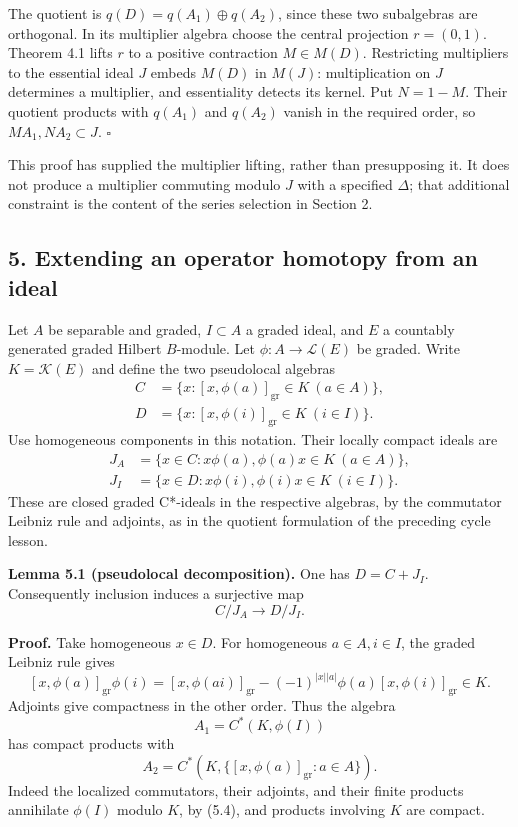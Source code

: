 \documentclass[
  11pt,
]{article}
\begin{document}
The quotient is \(q(D)=q(A_1)\oplus q(A_2)\), since these two
subalgebras are orthogonal. In its multiplier algebra choose the central
projection \(r=(0,1)\). Theorem 4.1 lifts \(r\) to a positive
contraction \(M\in M(D)\). Restricting multipliers to the essential
ideal \(J\) embeds \(M(D)\) in \(M(J)\): multiplication on \(J\)
determines a multiplier, and essentiality detects its kernel. Put
\(N=1-M\). Their quotient products with \(q(A_1)\) and \(q(A_2)\) vanish
in the required order, so \(MA_1,NA_2\subset J\). \(\square\)

This proof has supplied the multiplier lifting, rather than presupposing
it. It does not produce a multiplier commuting modulo \(J\) with a
specified \(\Delta\); that additional constraint is the content of the
series selection in Section 2.

\subsection{5. Extending an operator homotopy from an
ideal}\label{extending-an-operator-homotopy-from-an-ideal}

Let \(A\) be separable and graded, \(I\subset A\) a graded ideal, and
\(E\) a countably generated graded Hilbert \(B\)-module. Let
\(\phi:A\to\mathcal L(E)\) be graded. Write \(K=\mathcal K(E)\) and
define the two pseudolocal algebras \[
\begin{aligned}
C&=\{x:[x,\phi(a)]_{\mathrm{gr}}\in K\ (a\in A)\},\\
D&=\{x:[x,\phi(i)]_{\mathrm{gr}}\in K\ (i\in I)\}.
\end{aligned}
\tag{5.1}
\] Use homogeneous components in this notation. Their locally compact
ideals are \[
\begin{aligned}
J_A&=\{x\in C:x\phi(a),\phi(a)x\in K\ (a\in A)\},\\
J_I&=\{x\in D:x\phi(i),\phi(i)x\in K\ (i\in I)\}.
\end{aligned}
\tag{5.2}
\] These are closed graded C*-ideals in the respective algebras, by the
commutator Leibniz rule and adjoints, as in the quotient formulation of
the preceding cycle lesson.

\textbf{Lemma 5.1 (pseudolocal decomposition).} One has \(D=C+J_I\).
Consequently inclusion induces a surjective map \[
C/J_A\longrightarrow D/J_I.
\tag{5.3}
\]

\textbf{Proof.} Take homogeneous \(x\in D\). For homogeneous
\(a\in A,i\in I\), the graded Leibniz rule gives \[
[x,\phi(a)]_{\mathrm{gr}}\phi(i)
=[x,\phi(ai)]_{\mathrm{gr}}
-(-1)^{|x||a|}\phi(a)[x,\phi(i)]_{\mathrm{gr}}\in K.
\tag{5.4}
\] Adjoints give compactness in the other order. Thus the algebra \[
A_1=C^*(K,\phi(I))
\] has compact products with \[
A_2=C^*(K,\{[x,\phi(a)]_{\mathrm{gr}}:a\in A\}).
\tag{5.5}
\] Indeed the localized commutators, their adjoints, and their finite
products annihilate \(\phi(I)\) modulo \(K\), by (5.4), and products
involving \(K\) are compact.
\end{document}

